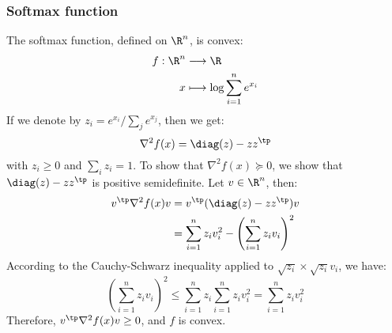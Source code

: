 \subsubsection{Softmax function}
The softmax function, defined on $\R^n$, is convex:
\begin{equation*}
    \begin{aligned}
        f: \R^n&\longrightarrow\R \\
        x &\longmapsto \log\sum_{i=1}^n e^{x_i}
    \end{aligned}
\end{equation*}
If we denote by $z_i = e^{x_i}/\sum_j e^{x_j}$, then we get:
\begin{equation*}
    \nabla^2 f(x) = \diag(z) - zz^\tp
\end{equation*}
with $z_i\geq0$ and $\sum_i z_i = 1$. To show that $\nabla^2 f(x)\succcurlyeq 0$, we show that $\diag(z) - zz^\tp$ is positive semidefinite. Let $v\in\R^n$, then:
\begin{equation*}
    \begin{aligned}
        v^\tp\nabla^2 f(x)v 
        &= v^\tp(\diag(z) - zz^\tp)v \\
        &= \sum_{i=1}^n z_i v_i^2 - \left(\sum_{i=1}^n z_i v_i\right)^2 \\
    \end{aligned}
\end{equation*}
According to the Cauchy-Schwarz inequality applied to $\sqrt{z_i}\times\sqrt{z_i}v_i$, we have:
\begin{equation*}
    \left(\sum_{i=1}^n z_i v_i\right)^2 \leq \sum_{i=1}^n z_i \sum_{i=1}^n z_i v_i^2 = \sum_{i=1}^n z_i v_i^2
\end{equation*}
Therefore, $v^\tp\nabla^2 f(x)v \geq 0$, and $f$ is convex.